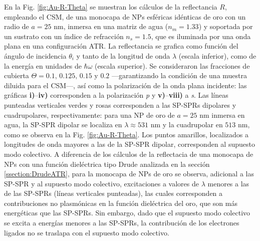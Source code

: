 En la Fig.  \ref{fig:Au-R-Theta} se muestran los cálculos de la reflectancia $R$, empleando el CSM, de una monocapa de NPs esféricas idénticas de oro con un radio de $a = 25$ nm, inmersa en una matriz de agua ($n_m = 1.33$) y soportada por un sustrato con un índice de refracción $n_s = 1.5$, que es iluminada por una onda plana en una configuración ATR. La reflectancia se grafica como función del ángulo de incidencia $\theta_i$ y tanto de la longitud de onda $\lambda$ (escala inferior), como de la energía en unidades de $\hbar\omega$ (escala superior). Se consideraron las fracciones de cubierta $\Theta = 0.1,\,0.125,\,0.15$ y $0.2$ ---garantizando la condición de una muestra diluida para el CSM---, así como la polarización de la onda plana incidente: las gráficas \textbf{i)}--\textbf{iv)} corresponden a la polarización \emph{p} y \textbf{v)}--\textbf{viii)} a \emph{s}. Las líneas punteadas verticales verdes y rosas corresponden a las SP-SPRs dipolares y cuadrupolares, respectivamente: para una NP de oro de $a= 25$ nm inmersa en agua, la SP-SPR dipolar se localiza en $\lambda \approx 531$ nm y la cuadrupolar en $513$ nm, como se observa en la Fig. \ref{fig:Au-R-Theta}. Los puntos amarillos, localizados a longitudes de onda mayores a las de la SP-SPR dipolar, corresponden al supuesto modo colectivo. A diferencia de los cálculos de la reflectacia de una monocapa de NPs  con una función dieléctrica tipo Drude analizada en la sección \ref{ssection:DrudeATR}, para la monocapa de NPs de oro se observa, adicional a las SP-SPR y al supuesto modo colectivo, excitaciones a valores de $\lambda$ menores a las de las SP-SPRs (líneas verticales punteadas), las cuales corresponden a contribuciones no plasmónicas en la función dieléctrica del oro, que son más energéticas que las SP-SPRs. Sin embargo, dado que el supuesto modo colectivo se excita a energías menores a las  SP-SPRs, la contribución de los electrones ligados no se traslapa con el supuesto modo colectivo. 


